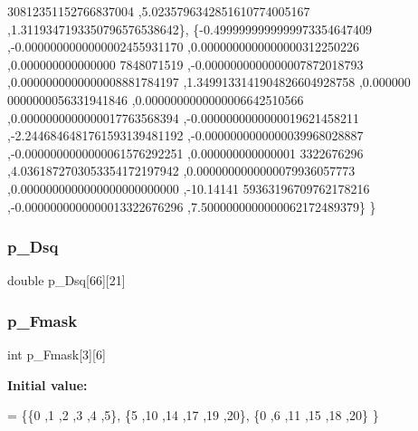 \begin{DoxyCode}
      30812351152766837004 ,5.0235796342851610774005167 ,1.3119347193350796576538642\},
\{-0.4999999999999973354647409 ,-0.0000000000000002455931170 ,0.0000000000000000312250226 ,0.000000000000000
      7848071519 ,-0.0000000000000007872018793 ,0.0000000000000008881784197 ,1.3499133141904826604928758 ,0.000000
      0000000056331941846 ,0.0000000000000006642510566 ,0.0000000000000017763568394 ,-0.0000000000000019621458211 
      ,-2.2446846481761593139481192 ,-0.0000000000000039968028887 ,-0.0000000000000061576292251 ,0.000000000000001
      3322676296 ,4.0361872703053354172197942 ,0.0000000000000079936057773 ,0.0000000000000000000000000 ,-10.14141
      59363196709762178216 ,-0.0000000000000013322676296 ,7.5000000000000062172489379\}
\}
\end{DoxyCode}
\mbox{\label{a00999_a159d5d2e9ede40c111bcdd697c78a32b}} 
\subsubsection{\texorpdfstring{p\+\_\+\+Dsq}{p\_Dsq}}
{\footnotesize\ttfamily double p\+\_\+\+Dsq\mbox{[}66\mbox{]}\mbox{[}21\mbox{]}}

\mbox{\label{a00999_a7556b1136ab46bbbbfda80a1ffcff11f}} 
\subsubsection{\texorpdfstring{p\+\_\+\+Fmask}{p\_Fmask}}
{\footnotesize\ttfamily int p\+\_\+\+Fmask\mbox{[}3\mbox{]}\mbox{[}6\mbox{]}}

{\bfseries Initial value\+:}
\begin{DoxyCode}
= \{\{0 ,1 ,2 ,3 ,4 ,5\},
\{5 ,10 ,14 ,17 ,19 ,20\},
\{0 ,6 ,11 ,15 ,18 ,20\}
\}
\end{DoxyCode}
\mbox{\label{a00999_af675a8dc393fa5980f6736a9b66361f2}} 
